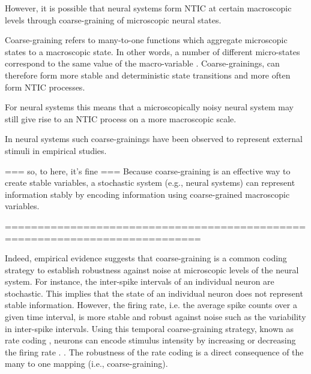 \documentclass[utf8]{article}
\begin{document}
  
		However, it is possible that neural systems form NTIC at certain macroscopic levels through coarse-graining of microscopic neural states.
		
		Coarse-graining refers to many-to-one functions which aggregate microscopic states to a macroscopic state. In other words, a number of different micro-states correspond to the same value of the macro-variable \citep{price2007causation}. Coarse-grainings, can therefore form more stable and deterministic state transitions and more often form NTIC processes. 
		
		For neural systems this means that a microscopically noisy neural system may still give rise to an NTIC process
		on a more macroscopic scale.
		
		In neural systems such coarse-grainings have been observed to represent external stimuli in empirical studies.
		

		=== so, to here, it's fine ===
		Because coarse-graining is an effective way to create stable variables, a stochastic system (e.g., neural systems) can represent information stably by encoding information using coarse-grained macroscopic variables. 
		
		============================================================================
		
		Indeed, empirical evidence suggests that coarse-graining is a common coding strategy to establish robustness against noise at microscopic levels of the neural system. For instance, the inter-spike intervals of an individual neuron are stochastic. This implies that the state of an individual neuron does not represent stable information. However, the firing rate, i.e. the average spike counts over a given time interval, is more stable and robust against noise such as the variability in inter-spike intervals. Using this temporal coarse-graining strategy, known as rate coding \citep{adrian1926impulses, gerstner2002spiking, maass2001pulsed, panzeri2015neural, stein2005neuronal}, neurons can encode stimulus intensity by increasing or decreasing the firing rate \citep{kandel2000principles}. \citep{stein2005neuronal}. The robustness of the rate coding is a direct consequence of the many to one mapping (i.e., coarse-graining).
		
\end{document}
